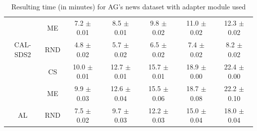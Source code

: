 \begin{table}[htbp]
\begin{tabular*}{\linewidth}{c|c|@{\extracolsep{\fill}}ccccc}
 & ME & 7.2 $\pm$ {\small 0.01} & 8.5 $\pm$ {\small 0.01} & 9.8 $\pm$ {\small 0.02} & 11.0 $\pm$ {\small 0.02} & 12.3 $\pm$ {\small 0.02}\\

\multirow{-3}{*}{\raggedright\arraybackslash CAL-SDS2} & RND & 4.8 $\pm$ {\small 0.02} & 5.7 $\pm$ {\small 0.02} & 6.5 $\pm$ {\small 0.02} & 7.4 $\pm$ {\small 0.02} & 8.2 $\pm$ {\small 0.02}\\
\midrule
 & CS & 10.0 $\pm$ {\small 0.01} & 12.7 $\pm$ {\small 0.01} & 15.7 $\pm$ {\small 0.01} & 18.9 $\pm$ {\small 0.00} & 22.4 $\pm$ {\small 0.00}\\

 & ME & 9.9 $\pm$ {\small 0.03} & 12.6 $\pm$ {\small 0.04} & 15.5 $\pm$ {\small 0.06} & 18.7 $\pm$ {\small 0.08} & 22.2 $\pm$ {\small 0.10}\\

\multirow{-3}{*}{\raggedright\arraybackslash AL} & RND & 7.5 $\pm$ {\small 0.02} & 9.7 $\pm$ {\small 0.03} & 12.2 $\pm$ {\small 0.03} & 15.0 $\pm$ {\small 0.04} & 18.0 $\pm$ {\small 0.04}\\
\bottomrule
\end{tabular*}
\caption{Resulting time (in minutes) for AG's news dataset with adapter module used}
\label{tab:time_full_agnews_10_adapter}
\end{table}
